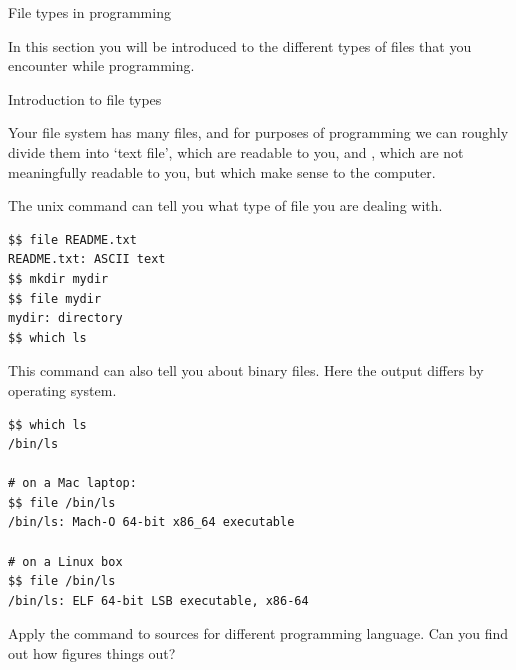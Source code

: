 
\lstset{style=\snippetstyle,language=shell}

 {File types in programming}

\begin{purpose}
  In this section you will be introduced to the different types of
  files that you encounter while programming.
\end{purpose}

 {Introduction to file types}

Your file system has many files, and for purposes of programming
we can roughly divide them into `text file', which are readable to you,
and ,
which are not meaningfully readable to you,
but which make sense to the computer.

The unix command  can tell you what type
of file you are dealing with.
\begin{lstlisting}[language=shell]
$$ file README.txt
README.txt: ASCII text
$$ mkdir mydir
$$ file mydir
mydir: directory
$$ which ls  
\end{lstlisting}

This command can also tell you about binary files.
Here the output differs by operating system.
\begin{lstlisting}
$$ which ls
/bin/ls

# on a Mac laptop:
$$ file /bin/ls
/bin/ls: Mach-O 64-bit x86_64 executable

# on a Linux box
$$ file /bin/ls
/bin/ls: ELF 64-bit LSB executable, x86-64
\end{lstlisting}

\begin{exercise}
  Apply the  command to sources for different programming
  language. Can you find out how  figures things out?
\end{exercise}

